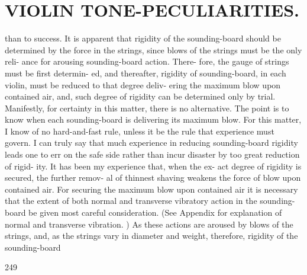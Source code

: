 \documentclass{article}
\begin{document}
\section*{VIOLIN TONE-PECULIARITIES.}
than to success. It is apparent that rigidity of the sounding-board should be determined by the force in the strings, since blows of the strings must be the only reli- ance for arousing sounding-board action. There- fore, the gauge of strings must be first determin- ed, and thereafter, rigidity of sounding-board, in each violin, must be reduced to that degree deliv- ering the maximum blow upon contained air, and, such degree of rigidity can be determined only by trial. Manifestly, for certainty in this matter, there is no alternative. The point is to know when each sounding-board is delivering its maximum blow. For this matter, I know of no hard-and-fast rule, unless it be the rule that experience must govern. I can truly say that much experience in reducing sounding-board rigidity leads one to err on the safe side rather than incur disaster by too great reduction of rigid- ity. It has been my experience that, when the ex- act degree of rigidity is secured, the further remov- al of thinnest shaving weakens the force of blow upon contained air. For securing the maximum blow upon contained air it is necessary that the extent of both normal and transverse vibratory action in the sounding- board be given most careful consideration. (See Appendix for explanation of normal and transverse vibration. ) As these actions are aroused by blows of the strings, and, as the strings vary in diameter and weight, therefore, rigidity of the sounding-board

249
\end{document}
